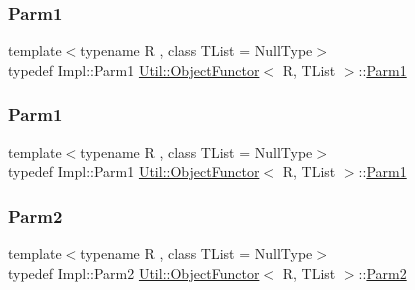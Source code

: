 \subsubsection{\texorpdfstring{Parm1}{Parm1}\hspace{0.1cm}{\footnotesize\ttfamily [1/2]}}
{\footnotesize\ttfamily template$<$typename R , class T\+List  = Null\+Type$>$ \\
typedef Impl\+::\+Parm1 \mbox{\hyperlink{classUtil_1_1ObjectFunctor}{Util\+::\+Object\+Functor}}$<$ R, T\+List $>$\+::\mbox{\hyperlink{classUtil_1_1ObjectFunctor_a199715d28029627c2ae7219c13b04d26}{Parm1}}}

\mbox{\label{classUtil_1_1ObjectFunctor_a199715d28029627c2ae7219c13b04d26}} 
\subsubsection{\texorpdfstring{Parm1}{Parm1}\hspace{0.1cm}{\footnotesize\ttfamily [2/2]}}
{\footnotesize\ttfamily template$<$typename R , class T\+List  = Null\+Type$>$ \\
typedef Impl\+::\+Parm1 \mbox{\hyperlink{classUtil_1_1ObjectFunctor}{Util\+::\+Object\+Functor}}$<$ R, T\+List $>$\+::\mbox{\hyperlink{classUtil_1_1ObjectFunctor_a199715d28029627c2ae7219c13b04d26}{Parm1}}}

\mbox{\label{classUtil_1_1ObjectFunctor_a6809cf65883dc7575e01d9b9849649cf}} 
\subsubsection{\texorpdfstring{Parm2}{Parm2}\hspace{0.1cm}{\footnotesize\ttfamily [1/2]}}
{\footnotesize\ttfamily template$<$typename R , class T\+List  = Null\+Type$>$ \\
typedef Impl\+::\+Parm2 \mbox{\hyperlink{classUtil_1_1ObjectFunctor}{Util\+::\+Object\+Functor}}$<$ R, T\+List $>$\+::\mbox{\hyperlink{classUtil_1_1ObjectFunctor_a6809cf65883dc7575e01d9b9849649cf}{Parm2}}}


